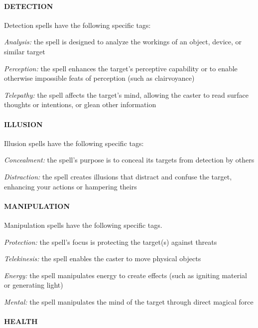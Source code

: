 \documentclass[oneside,10pt]{article}
\begin{document}
\begin{multicols}{2}
\begin{dent}
\end{dent}
\paragraph{DETECTION}

Detection spells have the following specific tags:
\begin{dent}

\textit{Analysis:} the spell is designed to analyze the workings of
an object, device, or similar target

\textit{Perception:} the spell enhances the target’s perceptive capability or to enable otherwise impossible feats of perception (such as clairvoyance)

\textit{Telepathy:} the spell affects the target’s mind, allowing the
caster to read surface thoughts or intentions, or glean other information
\end{dent}
\paragraph{ILLUSION}

Illusion spells have the following specific tags:
\begin{dent}

\textit{Concealment:} the spell’s purpose is to conceal its targets
from detection by others

\textit{Distraction:} the spell creates illusions that distract and confuse the target, enhancing your actions or hampering theirs
\end{dent}
\paragraph{MANIPULATION}

Manipulation spells have the following specific tags.
\begin{dent}

\textit{Protection:} the spell’s focus is protecting the target(s)
against threats

\textit{Telekinesis:} the spell enables the caster to move physical
objects

\textit{Energy:} the spell manipulates energy to create effects
(such as igniting material or generating light)

\textit{Mental:} the spell manipulates the mind of the target
through direct magical force
\end{dent}
\paragraph{HEALTH}


\end{multicols}
\end{document}
